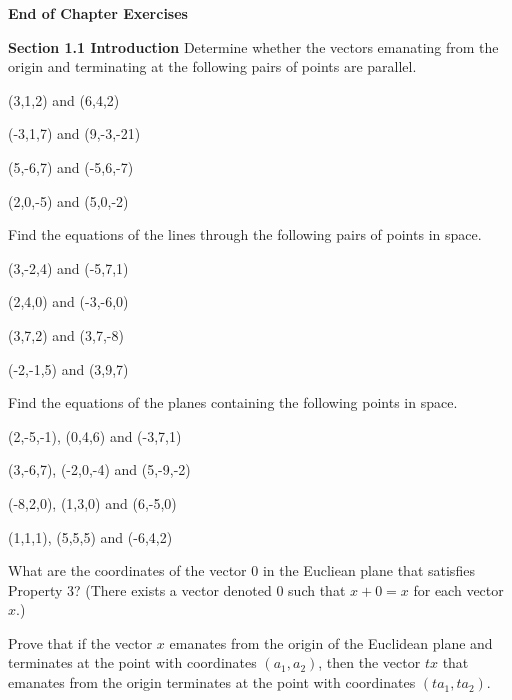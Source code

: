 \documentclass[11pt,largemargins]{homework}
\begin{document}
\maketitle

\textbf{\large{End of Chapter Exercises}}

\hfill 

\textbf{\large{Section 1.1} Introduction}
\question
Determine whether the vectors emanating from the origin and terminating at the following pairs of points are parallel.
\begin{alphaparts}
    \questionpart
    (3,1,2) and (6,4,2)

    \questionpart
    (-3,1,7) and (9,-3,-21)

    \questionpart
    (5,-6,7) and (-5,6,-7)

    \questionpart
    (2,0,-5) and (5,0,-2)

\end{alphaparts}

\question
Find the equations of the lines through the following pairs of points in space.
\begin{alphaparts}
    \questionpart
    (3,-2,4) and (-5,7,1)

    \questionpart
    (2,4,0) and (-3,-6,0)

    \questionpart
    (3,7,2) and (3,7,-8)

    \questionpart
    (-2,-1,5) and (3,9,7)

\end{alphaparts}

\question
Find the equations of the planes containing the following points in space.
\begin{alphaparts}
    \questionpart
    (2,-5,-1), (0,4,6) and (-3,7,1)

    \questionpart
    (3,-6,7), (-2,0,-4) and (5,-9,-2)

    \questionpart
    (-8,2,0), (1,3,0) and (6,-5,0)

    \questionpart
    (1,1,1), (5,5,5) and (-6,4,2)

\end{alphaparts}

\question
What are the coordinates of the vector $0$ in the Eucliean plane that satisfies Property 3? (There exists a vector 
denoted $0$ such that $x+0=x$ for each vector $x$.)

\question
Prove that if the vector $x$ emanates from the origin of the Euclidean plane and terminates at the point with coordinates 
$(a_1,a_2)$, then the vector $tx$ that emanates from the origin terminates at the point with coordinates $(ta_1,ta_2)$.
\end{document}
